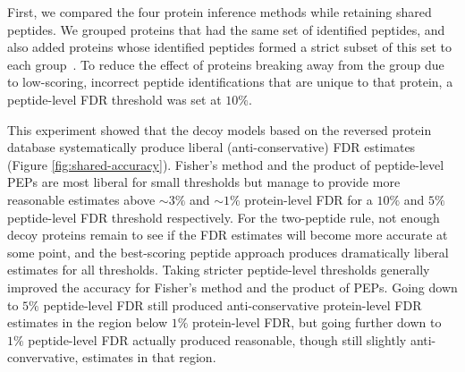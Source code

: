 \documentclass{article}
\begin{document}
First, we compared the four protein inference methods while retaining
shared peptides. We grouped proteins that had the same set of
identified peptides, and also added proteins whose identified peptides
formed a strict subset of this set to each
group~\cite{nesvizhskii2005interpretation,serang2012review}.
To reduce the effect of proteins breaking away from the
group due to low-scoring, incorrect peptide identifications that are
unique to that protein, a peptide-level FDR threshold was set at
$10\%$.

This experiment showed that the decoy models based on the reversed 
protein database systematically produce liberal (anti-conservative) 
FDR estimates (Figure \ref{fig:shared-accuracy}). Fisher's method and 
the product of peptide-level PEPs are most liberal for small 
thresholds but manage to provide more reasonable estimates above $\sim 
3\%$ and $\sim 1\%$ protein-level FDR for a $10\%$ and $5\%$ 
peptide-level FDR threshold respectively.
For the two-peptide rule, not enough decoy proteins remain to see if
the FDR estimates will become more accurate at some point, and the
best-scoring peptide approach produces dramatically liberal estimates
for all thresholds. Taking stricter peptide-level thresholds generally
improved the accuracy for Fisher's method and the product of PEPs.
Going down to $5\%$ peptide-level FDR still produced anti-conservative
protein-level FDR estimates in the region below $1\%$ protein-level
FDR, but going further down to $1\%$ peptide-level FDR actually
produced reasonable, though still slightly anti-convervative,
estimates in that region.
\end{document}
